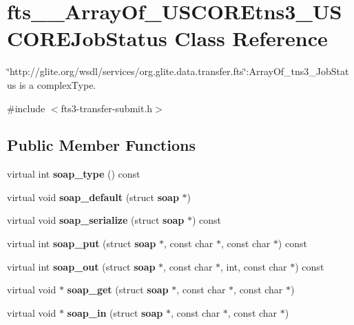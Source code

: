 \section{fts\_\-\_\-ArrayOf\_\-USCOREtns3\_\-USCOREJobStatus Class Reference}
\label{classfts____ArrayOf__USCOREtns3__USCOREJobStatus}


\char`\"{}http://glite.org/wsdl/services/org.glite.data.transfer.fts\char`\"{}:ArrayOf\_\-tns3\_\-JobStatus is a complexType.  




{\ttfamily \#include $<$fts3-\/transfer-\/submit.h$>$}

\subsection*{Public Member Functions}
\begin{DoxyCompactItemize}
\item 
virtual int {\bfseries soap\_\-type} () const \label{classfts____ArrayOf__USCOREtns3__USCOREJobStatus_a77b1810a5ed54ddc6c90a51b0863aa84}

\item 
virtual void {\bfseries soap\_\-default} (struct {\bf soap} $\ast$)\label{classfts____ArrayOf__USCOREtns3__USCOREJobStatus_acf35527bce841028850ec1a8828e81a6}

\item 
virtual void {\bfseries soap\_\-serialize} (struct {\bf soap} $\ast$) const \label{classfts____ArrayOf__USCOREtns3__USCOREJobStatus_ae12f4ba66fd7c10085ec1e2cb0c62188}

\item 
virtual int {\bfseries soap\_\-put} (struct {\bf soap} $\ast$, const char $\ast$, const char $\ast$) const \label{classfts____ArrayOf__USCOREtns3__USCOREJobStatus_abcdfaedf9448b06e58451b1f5914f274}

\item 
virtual int {\bfseries soap\_\-out} (struct {\bf soap} $\ast$, const char $\ast$, int, const char $\ast$) const \label{classfts____ArrayOf__USCOREtns3__USCOREJobStatus_af1e6ef099bc90bd670bd25c6c2487e03}

\item 
virtual void $\ast$ {\bfseries soap\_\-get} (struct {\bf soap} $\ast$, const char $\ast$, const char $\ast$)\label{classfts____ArrayOf__USCOREtns3__USCOREJobStatus_a8344ba3a375dce4b52d94ba56d632c18}

\item 
virtual void $\ast$ {\bfseries soap\_\-in} (struct {\bf soap} $\ast$, const char $\ast$, const char $\ast$)\label{classfts____ArrayOf__USCOREtns3__USCOREJobStatus_aad2c1924eb365869c324460b730dbcdf}

\end{DoxyCompactItemize}
